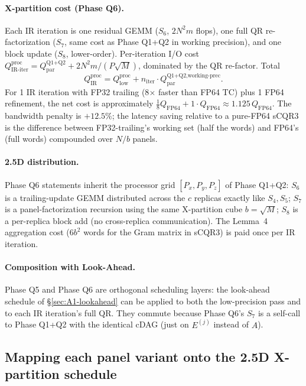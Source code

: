 \documentclass[11pt]{article}
\begin{document}
\paragraph{X-partition cost (Phase Q6).}
Each IR iteration is one residual GEMM ($S_6$, $2 N^2 m$ flops),
one full QR re-factorization ($S_7$, same cost as Phase Q1+Q2 in
working precision), and one block update ($S_8$, lower-order).
Per-iteration I/O cost
$Q_{\text{IR-iter}}^{\text{proc}} = Q_{\text{par}}^{\text{Q1+Q2}}
+ 2 N^2 m / (P \sqrt{M})$, dominated by the QR re-factor. Total
\[
  \boxed{\; Q_{\text{IR}}^{\text{proc}} =
  Q_{\text{low}}^{\text{proc}} + n_{\text{iter}} \cdot
  Q_{\text{par}}^{\text{Q1+Q2,working-prec}}. \;}
\]
For 1 IR iteration with FP32 trailing (8$\times$ faster than FP64 TC)
plus 1 FP64 refinement, the net cost is approximately
$\tfrac{1}{8} Q_{\text{FP64}} + 1 \cdot Q_{\text{FP64}}
\approx 1.125\,Q_{\text{FP64}}$. The bandwidth penalty is $+12.5\%$;
the latency saving relative to a pure-FP64 sCQR3 is the difference
between FP32-trailing's working set (half the words) and FP64's (full
words) compounded over $N/b$ panels.

\paragraph{2.5D distribution.}
Phase Q6 statements inherit the processor grid
$[P_x, P_y, P_z]$ of Phase Q1+Q2: $S_6$ is a trailing-update GEMM
distributed across the $c$ replicas exactly like $S_4, S_5$;
$S_7$ is a panel-factorization recursion using the same X-partition
cube $b = \sqrt{M}$; $S_8$ is a per-replica block add (no cross-replica
communication). The Lemma~4 aggregation cost ($6b^2$ words for the
Gram matrix in sCQR3) is paid once per IR iteration.

\paragraph{Composition with Look-Ahead.}
Phase Q5 and Phase Q6 are orthogonal scheduling layers: the look-ahead
schedule of \S\ref{sec:A1-lookahead} can be applied to both the
low-precision pass and to each IR iteration's full QR. They commute
because Phase Q6's $S_7$ is a self-call to Phase Q1+Q2 with the
identical cDAG (just on $E^{(j)}$ instead of $A$).

\subsection*{Mapping each panel variant onto the 2.5D X-partition schedule}
\label{sec:per-variant-schedule}
\end{document}
